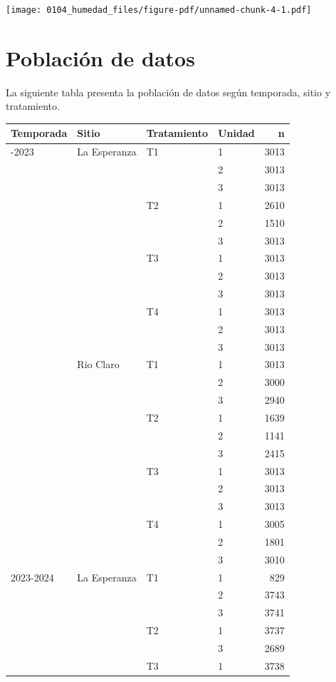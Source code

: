 \documentclass[
  letterpaper,
  DIV=11,
  numbers=noendperiod]{scrreprt}
\begin{document}
\begin{center}
\texttt{[image: 0104\_humedad\_files/figure-pdf/unnamed-chunk-4-1.pdf]}
\end{center}

\chapter{Población de datos}

La siguiente tabla presenta la población de datos según temporada, sitio
y tratamiento.

\begin{longtable}[]{@{}llllr@{}}
\toprule\noalign{}
Temporada & Sitio & Tratamiento & Unidad & n \\
\midrule\noalign{}
\endhead
\bottomrule\noalign{}
\endlastfoot
2022-2023 & La Esperanza & T1 & 1 & 3013 \\
& & & 2 & 3013 \\
& & & 3 & 3013 \\
& & T2 & 1 & 2610 \\
& & & 2 & 1510 \\
& & & 3 & 3013 \\
& & T3 & 1 & 3013 \\
& & & 2 & 3013 \\
& & & 3 & 3013 \\
& & T4 & 1 & 3013 \\
& & & 2 & 3013 \\
& & & 3 & 3013 \\
& Rio Claro & T1 & 1 & 3013 \\
& & & 2 & 3000 \\
& & & 3 & 2940 \\
& & T2 & 1 & 1639 \\
& & & 2 & 1141 \\
& & & 3 & 2415 \\
& & T3 & 1 & 3013 \\
& & & 2 & 3013 \\
& & & 3 & 3013 \\
& & T4 & 1 & 3005 \\
& & & 2 & 1801 \\
& & & 3 & 3010 \\
2023-2024 & La Esperanza & T1 & 1 & 829 \\
& & & 2 & 3743 \\
& & & 3 & 3741 \\
& & T2 & 1 & 3737 \\
& & & 3 & 2689 \\
& & T3 & 1 & 3738 \\

\end{longtable}
\end{document}
